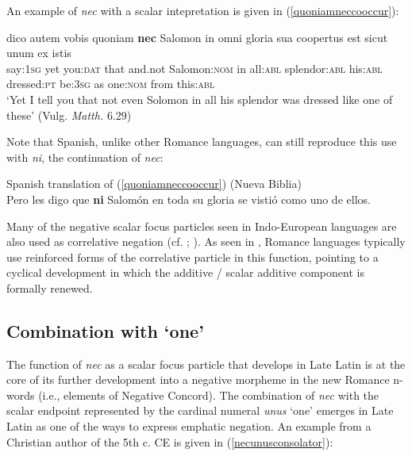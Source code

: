 \documentclass[output=paper,modfonts,nonflat,citecolor=brown,
showindex
]{langsci/langscibook}
\begin{document}
An example of {\emph{nec}} with a scalar intepretation is given in (\ref{quoniamneccooccur}):

{\begin{exe}
\ex \label{quoniamneccooccur} \gll dico autem vobis quoniam {\textbf{nec}} Salomon in omni gloria sua coopertus est sicut unum ex istis\\
say:{\textsc{1sg}} yet you:{\textsc{dat}} that and.not Salomon:{\textsc{nom}} in all:{\textsc{abl}} splendor:{\textsc{abl}} his:{\textsc{abl}} dressed:{\textsc{pt}} be:{\textsc{3sg}} as one:{\textsc{nom}} from this:{\textsc{abl}}\\

`Yet I tell you that not even Solomon in all his splendor was dressed like one of these' (Vulg. {\emph{Matth.}} 6.29)
\end{exe}}

\noindent Note that Spanish, unlike other Romance languages, can still reproduce this use with {\emph{ni}}, the continuation of {\emph{nec}}:

{\begin{exe}
\ex Spanish translation of (\ref{quoniamneccooccur}) (Nueva Biblia)\\
Pero les digo que {\textbf{ni}} Salom\'on en toda su gloria se visti\'o como uno de ellos.
\end{exe}}

\noindent Many of the negative scalar focus particles seen in Indo-European languages are also used as correlative negation (cf. \citealt[chapter 4]{Koenig91}; \citealt[]{Haspelmath07}). As seen in , Romance languages typically use reinforced forms of the correlative particle in this function, pointing to a cyclical development in which the additive / scalar additive component is formally renewed.

\subsection{Combination with `one'}

The function of {\emph{nec}} as a scalar focus particle that develops in Late Latin is at the core of its further development into a negative morpheme in the new Romance n-words (i.e., elements of Negative Concord). The combination of {\emph{nec}} with the scalar endpoint represented by the cardinal numeral {\emph{unus}} `one' emerges in Late Latin as one of the ways to express emphatic negation. An example from a Christian author of the 5th c. CE is given in (\ref{necunusconsolator}):
\end{document}

